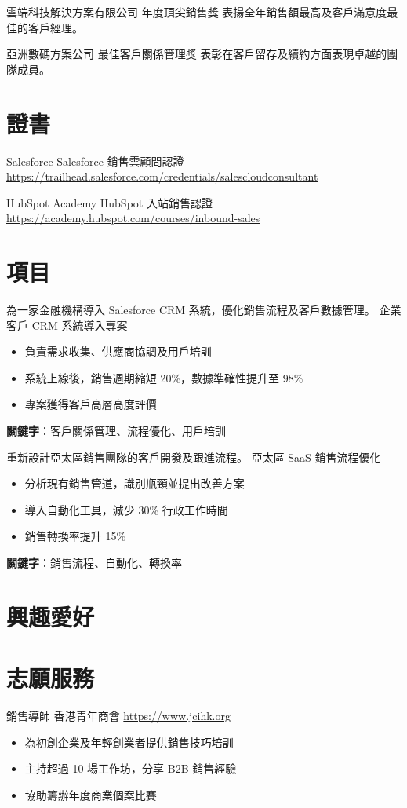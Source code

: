 \documentclass[a4paper, serif, 10pt]{moderncv}
\begin{document}
        {雲端科技解決方案有限公司}
        {年度頂尖銷售獎}
        {}
        {}
        {表揚全年銷售額最高及客戶滿意度最佳的客戶經理。}

        {亞洲數碼方案公司}
        {最佳客戶關係管理獎}
        {}
        {}
        {表彰在客戶留存及續約方面表現卓越的團隊成員。}
\section{證書}

        {Salesforce}
        {Salesforce 銷售雲顧問認證}
        {\url{https://trailhead.salesforce.com/credentials/salescloudconsultant}}
        {}
        {}

        {HubSpot Academy}
        {HubSpot 入站銷售認證}
        {\url{https://academy.hubspot.com/courses/inbound-sales}}
        {}
        {}
\section{項目}

        {為一家金融機構導入 Salesforce CRM 系統，優化銷售流程及客戶數據管理。}
        {企業客戶 CRM 系統導入專案}
        {}
        {}
        {\begin{itemize}
\item 負責需求收集、供應商協調及用戶培訓
\item 系統上線後，銷售週期縮短 20\%，數據準確性提升至 98\%
\item 專案獲得客戶高層高度評價
\end{itemize}
\textbf{關鍵字}：客戶關係管理、流程優化、用戶培訓}

        {重新設計亞太區銷售團隊的客戶開發及跟進流程。}
        {亞太區 SaaS 銷售流程優化}
        {}
        {}
        {\begin{itemize}
\item 分析現有銷售管道，識別瓶頸並提出改善方案
\item 導入自動化工具，減少 30\% 行政工作時間
\item 銷售轉換率提升 15\%
\end{itemize}
\textbf{關鍵字}：銷售流程、自動化、轉換率}
\section{興趣愛好}

\section{志願服務}

        {銷售導師}
        {香港青年商會}
        {\url{https://www.jcihk.org}}
        {}
        {\begin{itemize}
\item 為初創企業及年輕創業者提供銷售技巧培訓
\item 主持超過 10 場工作坊，分享 B2B 銷售經驗
\item 協助籌辦年度商業個案比賽
\end{itemize}}
    
\end{document}
